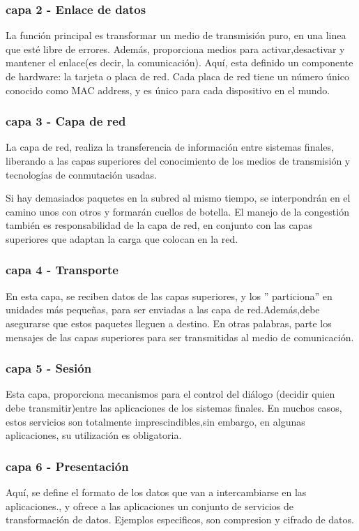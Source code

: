 \subsubsection{capa 2 - Enlace de datos } 
La función principal es transformar un medio de transmisión puro, en una linea que esté libre de errores. Además, proporciona medios para activar,desactivar y mantener el enlace(es decir, la comunicación). Aquí, esta definido un componente de hardware: la tarjeta o placa de red. Cada placa de red tiene un número único conocido como MAC address, y es único para cada dispositivo en el mundo. 

\subsubsection{capa 3 - Capa de red}
La capa de red, realiza la transferencia de información entre sistemas finales, liberando a las capas superiores del conocimiento de los medios de transmisión y tecnologías de conmutación usadas. 

Si hay demasiados paquetes en la subred al mismo tiempo, se interpondrán en el camino unos con
otros y formarán cuellos de botella. El manejo de la congestión también es responsabilidad de la capa de
red, en conjunto con las capas superiores que adaptan la carga que colocan en la red.
\subsubsection{capa 4 - Transporte }
En esta capa, se reciben datos de las capas superiores, y los '' particiona'' en unidades más pequeñas, para ser enviadas a las capa de red.Además,debe asegurarse  que estos paquetes lleguen a destino. En otras palabras, parte los mensajes de las capas superiores para ser transmitidas al medio de comunicación. 

\subsubsection{capa 5 - Sesión  }
Esta capa, proporciona mecanismos para el control del diálogo (decidir quien debe transmitir)entre las aplicaciones de los sistemas finales. En muchos casos, estos servicios son totalmente  imprescindibles,sin embargo, en algunas aplicaciones, su utilización es obligatoria. 

\subsubsection{capa 6 - Presentación}
Aquí, se define el formato de los datos que van a intercambiarse en las aplicaciones., y ofrece a las aplicaciones un conjunto de servicios de transformación de datos. Ejemplos especificos, son compresion y cifrado de datos. 


